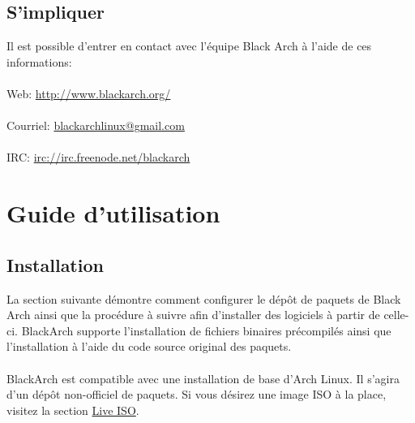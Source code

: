 \documentclass[a4paper, oneside, 11pt]{book}
\begin{document}


\section{S'impliquer}
Il est possible d'entrer en contact avec l'équipe Black Arch à l'aide de ces
informations:
\\\\
Web: \url{http://www.blackarch.org/}
\\\\
Courriel: \href{mailto:blackarchlinux@gmail.com}{blackarchlinux@gmail.com}
\\\\
IRC: \url{irc://irc.freenode.net/blackarch}


\chapter{Guide d'utilisation}

\section{Installation}
La section suivante démontre comment configurer le dépôt de paquets de Black
Arch ainsi que la procédure à suivre afin d'installer des logiciels à partir de
celle-ci. BlackArch supporte l'installation de fichiers binaires précompilés
ainsi que l'installation à l'aide du code source original des paquets.
\\\\
BlackArch est compatible avec une installation de base d'Arch Linux. Il s'agira
d'un dépôt non-officiel de paquets. Si vous désirez une image ISO à la place,
visitez la section \href{http://www.blackarch.org/download.html#iso}{Live ISO}.
\\\\
\end{document}
